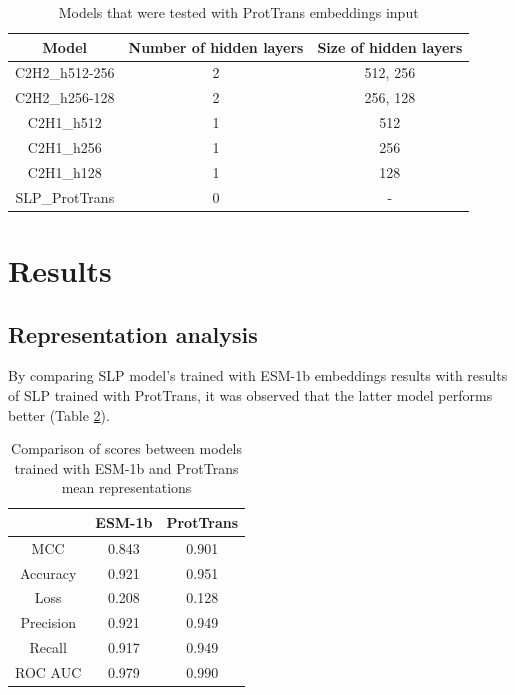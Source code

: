 \documentclass[12pt]{article}
\begin{document}
	\begin{table}[h!]
		\caption{Models that were tested with ProtTrans embeddings input}
		\vspace{0.2cm}
		\centering
		\begin{tabular}{ | c | c c | }
			\hline 
			Model & Number of hidden layers & Size of hidden layers \\
			\hline 
			C2H2\_h512-256 & 2 & 512, 256 \\
			C2H2\_h256-128 & 2 & 256, 128 \\
			C2H1\_h512 & 1 & 512 \\
			C2H1\_h256 & 1 & 256 \\
			C2H1\_h128 & 1 & 128 \\
			SLP\_ProtTrans & 0 & - \\
			\hline    
		\end{tabular}
		\label{table:modelArchitecturesPT}
	\end{table}

	\newpage

	\section{Results}

	\subsection{Representation analysis}

	By comparing SLP model's trained with ESM-1b embeddings results
	with results of SLP trained with ProtTrans, it was observed that 
	the latter model performs better (Table \ref{table:comparisonESMandPT}).

	\begin{table}[h!]
		\caption{Comparison of scores between models trained with ESM-1b
		and ProtTrans mean representations}
		\vspace{0.2cm}
		\centering
		\begin{tabular}{ | c | c c | }
			\hline 
						
			& ESM-1b & ProtTrans \\
			\hline 
			MCC & 0.843 & 0.901 \\
			Accuracy & 0.921 & 0.951 \\
			Loss & 0.208 & 0.128 \\
			Precision & 0.921 & 0.949 \\
			Recall & 0.917 & 0.949 \\
			ROC AUC & 0.979 & 0.990 \\
			\hline    
		\end{tabular}
		\label{table:comparisonESMandPT}
	\end{table}
\end{document}
